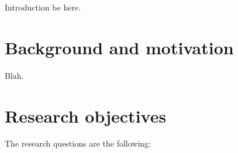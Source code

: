 
Introduction be here.

\section{Background and motivation}

Blah.

\section{Research objectives}
\label{sect:questions}

The research questions are the following:


